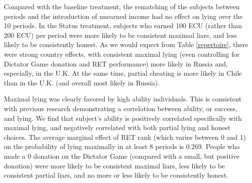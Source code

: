 \documentclass[12pt]{article}
\begin{document}
\par Compared with the baseline treatment, the rematching of the subjects between periods and the introduction of unearned income had no effect on lying over the 10 periods. In the Status treatment, subjects who earned 100 ECU (rather than 200 ECU) per period were more likely to be consistent maximal liars, and less likely to be consistently honest.   
As we would expect from Table \ref{repertoire}, there were strong country effects, with consistent maximal lying (even controlling for Dictator Game donation and RET performance) more likely in Russia and, especially, in the U.K. At the same time, partial cheating is more likely in Chile than in the U.K. (and overall most likely in Russia). 



 
\par Maximal lying was clearly favored by high ability individuals.  This is consistent with previous research \citep{Schurretal2016,Vincentetal2015,DuchSolaz2017} demonstrating a correlation between ability, or success, and lying. We find that subject's ability is positively correlated specifically with maximal lying, and negatively correlated with both partial lying and honest choices. The average marginal effect of RET rank (which varies between 0 and 1) on the probability of lying maximally in at least 8 periods is 0.269.  People who made a 0 donation on the Dictator Game (compared with a small, but positive donation) were more likely to be consistent maximal liars, less likely to be consistent partial liars, and no more or less likely to be consistently honest. 
\end{document}
